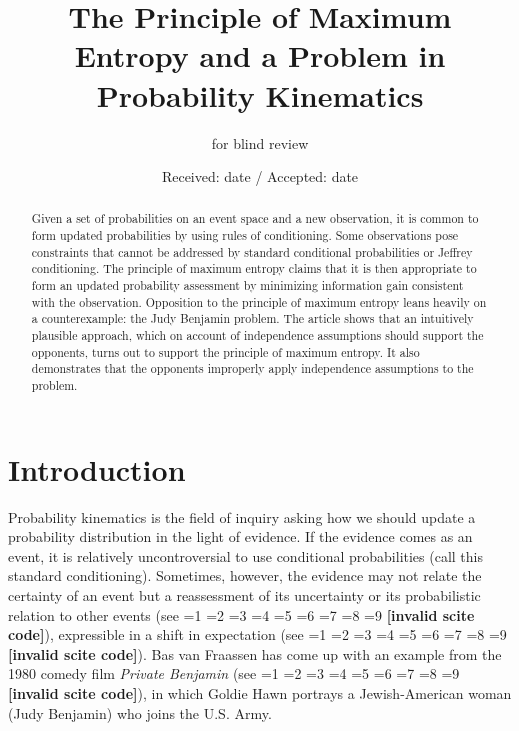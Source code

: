 \documentclass[smallextended]{svjour3}       %
\newcommand{\nias}{\noindent} %
\newcommand{\nonsc}[1]{}
\newcommand{\PageP}{p.~}
\newcommand{\PageP}{}
\newcommand{\scite}[3]{\ifnum#1=1\cite{#2}\else
\ifnum#1=2\cite[{\PageP}~#3]{#2}\else
\ifnum#1=3\cite[{\PageP}~#3]{#2}\else
\ifnum#1=4\cite{#2}\else
\ifnum#1=5\cite{#2}\else
\ifnum#1=6\cite[{\PageP}~#3]{#2}\else
\ifnum#1=7\cite{#2}\else
\ifnum#1=8\cite[{\PageP}~#3]{#2}\else
\ifnum#1=9\cite[{\PageP}~#3]{#2}\else
\textbf{[invalid scite code]}\fi\fi\fi\fi\fi\fi\fi\fi\fi}
\begin{document}
\title{The Principle of Maximum Entropy and a Problem in Probability Kinematics}

\author{for blind review}


\date{Received: date / Accepted: date}

\maketitle

\begin{abstract}
  Given a set of probabilities on an event space and a new
  observation, it is common to form updated probabilities by using
  rules of conditioning. Some observations pose constraints that
  cannot be addressed by standard conditional probabilities or Jeffrey
  conditioning. The principle of maximum entropy claims that it is
  then appropriate to form an updated probability assessment by
  minimizing information gain consistent with the observation.
  Opposition to the principle of maximum entropy leans heavily on a
  counterexample: the Judy Benjamin problem. The article shows that an
  intuitively plausible approach, which on account of independence
  assumptions should support the opponents, turns out to support the
  principle of maximum entropy. It also demonstrates that the
  opponents improperly apply independence assumptions to the problem.
\end{abstract}

\section{Introduction}
\label{intro}

\nias Probability kinematics is the field of inquiry asking how we
should update a probability distribution in the light of evidence. If
the evidence comes as an event, it is relatively uncontroversial to
use conditional probabilities (call this standard conditioning).
Sometimes, however, the evidence may not relate the certainty of an
event but a reassessment of its uncertainty or its probabilistic
relation to other events (see \scite{8}{jeffrey65}{153ff}),
expressible in a shift in expectation (see \scite{7}{hobson71}{}). Bas
van Fraassen has come up with an example from the 1980 comedy film
\emph{Private Benjamin} (see \scite{7}{fraassen81}{})\nonsc{}, in
which Goldie Hawn portrays a Jewish-American woman (Judy Benjamin) who
joins the U.S. Army.
\end{document}
